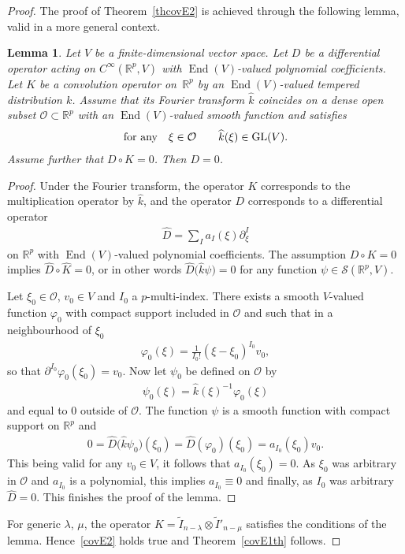 \documentclass[10pt,a4paper]{amsart}
\DeclareMathOperator{\End}{End}
\numberwithin{equation}{section}
\newtheorem{lem}[theor]{Lemma}
\begin{document}
\begin{proof}
The proof of Theorem~\ref{thcovE2} is achieved through the following lemma, valid in a more general context.

\begin{lem} Let $V$ be a finite-dimensional vector space. Let $D$ be a differential operator acting on $C^\infty(\mathbb R^p, V)$ with $\End(V)$-valued polynomial coefficients. Let $K$ be a convolution operator on~$\mathbb R^p$ by an $\End(V)$-valued tempered distribution $k$. Assume that its Fourier transform $\widehat k$ coincides on a dense open subset $\mathcal O\subset \mathbb R^p$ with an $\End(V)$-valued smooth function and satisfies
\begin{gather*}
\text{for any}\quad \xi\in \mathcal O \qquad \widehat{k}(\xi) \in {\rm GL}(V).
\end{gather*}
Assume further that $D\circ K=0$. Then $D=0$.
\end{lem}
\begin{proof} Under the Fourier transform, the operator $K$ corresponds to the multiplication operator by $\widehat k$, and the operator $D$ corresponds to a differential operator \begin{gather*}\widehat D= \sum_I a_I(\xi) \partial_\xi^I\end{gather*}
 on $\mathbb R^p$ with $\End(V)$-valued polynomial coefficients. The assumption $D\circ K=0$ implies $\widehat D \circ \widehat K = 0$, or in other words $\widehat D\big(\widehat k \psi\big) = 0$ for any function $\psi\in \mathcal S(\mathbb R^p, V)$.

Let $\xi_0\in \mathcal O$, $v_0\in V$ and $I_0$ a $p$-multi-index. There exists a smooth $V$-valued function $\varphi_0$ with compact support included in $\mathcal O$ and such that in a neighbourhood of $\xi_0$
\begin{gather*}
\varphi_0(\xi) =\frac{1}{I_0!} (\xi-\xi_0)^{I_0} v_0,
\end{gather*}
so that $\partial^{I_0}\varphi_0(\xi_0) = v_0$. Now let $\psi_0$ be defined on $\mathcal O$ by
\begin{gather*}
\psi_0(\xi) = \widehat k (\xi) ^{-1} \varphi_0(\xi)
\end{gather*}
and equal to $0$ outside of $\mathcal O$. The function $\psi$ is a smooth function with compact support on $\mathbb R^p$ and
\begin{gather*}
0=\widehat D \big(\widehat k \psi_0\big) (\xi_0) = \widehat D(\varphi_0)(\xi_0) = a_{I_0}(\xi_0) v_0.
\end{gather*}
This being valid for any $v_0\in V$, it follows that $a_{I_0}(\xi_0) = 0$. As $\xi_0$ was arbitrary in $\mathcal O$ and $a_{I_0}$ is a polynomial, this implies $a_{I_0}\equiv 0$ and finally, as $I_0$ was arbitrary $\widehat D=0$. This finishes the proof of the lemma.
\end{proof}

For generic $\lambda$, $\mu$, the operator $K=\widetilde I_{n-\lambda}\otimes \widetilde I'_{n-\mu}$ satisfies the conditions of the lemma. Hence~\eqref{covE2} holds true and Theorem~\ref{covE1th} follows.
\end{proof}
\end{document}
